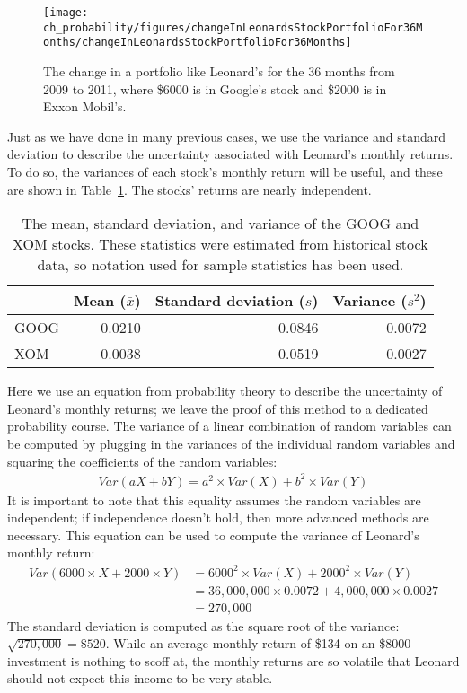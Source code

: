 \begin{figure}[ht]
\centering
\texttt{[image: ch\_probability/figures/changeInLeonardsStockPortfolioFor36Months/changeInLeonardsStockPortfolioFor36Months]}
\caption{The change in a portfolio like Leonard's for the 36 months from 2009 to 2011, where \$6000 is in Google's stock and \$2000 is in Exxon Mobil's.}
\label{changeInLeonardsStockPortfolioFor36Months}
\end{figure}

Just as we have done in many previous cases, we use the variance and standard deviation to describe the uncertainty associated with Leonard's monthly returns. To do so, the variances of each stock's monthly return will be useful, and these are shown in Table~\ref{sumStatOfGOOGXOM}. The stocks' returns are nearly independent.

\begin{table}
\centering
\begin{tabular}{lrrr}
\hline
	& Mean ($\bar{x}$) & Standard deviation ($s$) & Variance ($s^2$) \\
\hline
GOOG & 0.0210	& 0.0846					&	0.0072	\\
XOM & 0.0038		& 0.0519					&	0.0027	\\
\hline
\end{tabular}
\caption{The mean, standard deviation, and variance of the GOOG and XOM stocks. These statistics were estimated from historical stock data, so notation used for sample statistics has been used.}
\label{sumStatOfGOOGXOM}
\end{table}

Here we use an equation from probability theory to describe the uncertainty of Leonard's monthly returns; we leave the proof of this method to a dedicated probability course. The variance of a linear combination of random variables can be computed by plugging in the variances of the individual random variables and squaring the coefficients of the random variables:
\begin{align*}
Var(aX + bY) = a^2\times Var(X) + b^2\times Var(Y)
\end{align*}
It is important to note that this equality assumes the random variables are independent; if independence doesn't hold, then more advanced methods are necessary. This equation can be used to compute the variance of Leonard's monthly return:
\begin{align*}
Var(6000\times X + 2000\times Y)
	&= 6000^2\times Var(X) + 2000^2\times Var(Y) \\
	&= 36,000,000\times 0.0072 + 4,000,000\times 0.0027 \\
	&= 270,000
\end{align*}
The standard deviation is computed as the square root of the variance: $\sqrt{270,000} = \$520$. While an average monthly return of \$134 on an \$8000 investment is nothing to scoff at, the monthly returns are so volatile that Leonard should not expect this income to be very stable.

